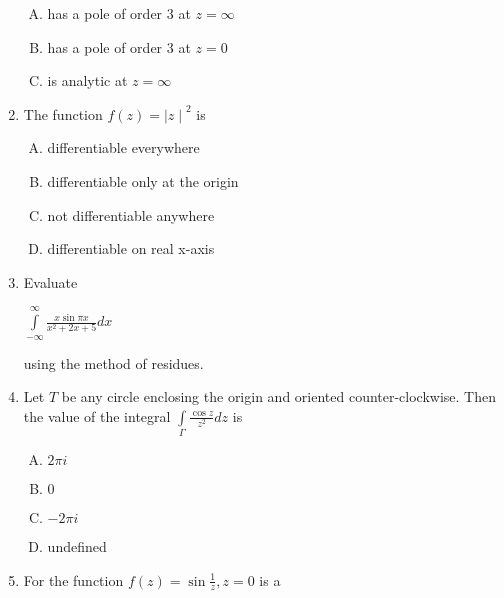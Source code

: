 \documentclass[12pt,a4paper]{article}
\begin{document}
\begin{enumerate}
\begin{enumerate}[(A)]
\item 
has a pole of order $3$ at $z=\infty$

\item 
has a pole of order $3$ at $z=0$

\item 
is analytic at $z=\infty$

\end{enumerate}

\item The function $f(z) = {\mid z \mid}^2 $ is


\begin{enumerate}[(A)]

\item 
differentiable everywhere

\item 
differentiable only at the origin

\item 
not differentiable anywhere

\item 
differentiable on real x-axis

\end{enumerate}

\item Evaluate

$\int\limits_{- \infty}^{\infty} \frac{x \sin \pi x}{x^2+2x+5} dx $

using the method of residues.

\item Let $T$ be any circle enclosing the origin and oriented counter-clockwise.
Then the value of the integral $ \int\limits_{\Gamma} \frac{\cos z}{z^2} dz $ is

\begin{enumerate}[(A)]

\item $
2 \pi i
$

\item $
0
$

\item $
-2 \pi i
$

\item 
undefined

\end{enumerate}


\item For the function $f(z) = \sin \frac{1}{z} , z=0 $ is a

\begin{enumerate}[(A)]


\end{enumerate}
\end{enumerate}
\end{document}
